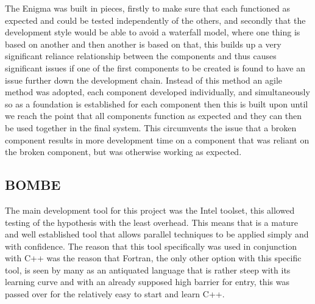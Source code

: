 \documentclass[12pt,a4paper]{article}
\begin{document}
The Enigma was built in pieces, firstly to make sure that each functioned as expected and could be tested independently of the others, and secondly that the development style would be able to avoid a waterfall model, where one thing is based on another and then another is based on that, this builds up a very significant reliance relationship between the components and thus causes significant issues if one of the first components to be created is found to have an issue further down the development chain. Instead of this method an agile method was adopted, each component developed individually, and simultaneously so as a foundation is established for each component then this is built upon until we reach the point that all components function as expected and they can then be used together in the final system. This circumvents the issue that a broken component results in more development time on a component that was reliant on the broken component, but was otherwise working as expected.

\subsection{BOMBE}

The main development tool for this project was the Intel toolset, this allowed testing of the hypothesis with the least overhead. This means that is a mature and well established tool that allows parallel techniques to be applied simply and with confidence. The reason that this tool specifically was used in conjunction with C++ was the reason that Fortran, the only other option with this specific tool, is seen by many as an antiquated language that is rather steep with its learning curve and with an already supposed high barrier for entry, this was passed over for the relatively easy to start and learn C++.\\
\end{document}
